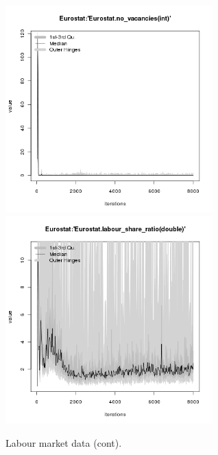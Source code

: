 \begin{figure}[H!]
\centering\leavevmode
\begin{minipage}{17cm}
\centering\leavevmode
\includegraphics[width=8cm]{./benchmark_plots/Eurostat-no_vacancies.png}
\includegraphics[width=8cm]{./benchmark_plots/Eurostat-labour_share_ratio.png}
\end{minipage}
\caption{Labour market data (cont).}
\label{Figure: Labour Market 2}
\end{figure}

\clearpage


